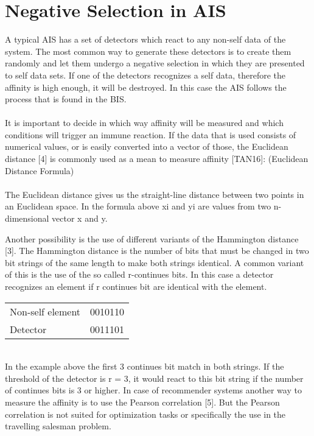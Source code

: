 \section{Negative Selection in AIS}

A typical AIS has a set of detectors which react to any non-self data of the system. The most common way to generate these detectors is to create them randomly and let them undergo a negative selection in which they are presented to self data sets. If one of the detectors recognizes a self data, therefore the affinity is high enough, it will be destroyed. In this case the AIS follows the process that is found in the BIS.\\\\ 
It is important to decide in which way affinity will be measured and which conditions will trigger an immune reaction. If the data that is used consists of numerical values, or is easily converted into a vector of those, the Euclidean distance [4] is commonly used as a mean to measure affinity [TAN16]: (Euclidean Distance Formula)\\\\
The Euclidean distance gives us the straight-line distance between two points in an Euclidean space. In the formula above xi and yi are values from two n-dimensional vector x and y.  

Another possibility is the use of different variants of the Hammington distance [3]. The Hammington distance is the number of bits that must be changed in two bit strings of the same length to make both strings identical. A common variant of this is the use of the so called r-continues bits. In this case a detector recognizes an element if r continues bit are identical with the element.\\
\begin{table*}[htbp]
	\begin{tabular}{ll}
Non-self element & 0010110\\
Detector & 0011101
	\end{tabular}
\end{table*}\\
In the example above the first 3 continues bit match in both strings. If the threshold of the detector is r = 3, it would react to this bit string if the number of continues bits is 3 or higher.
In case of recommender systems another way to measure the affinity is to use the Pearson correlation [5]. But the Pearson correlation is not suited for optimization tasks or specifically the use in the travelling salesman problem. 
